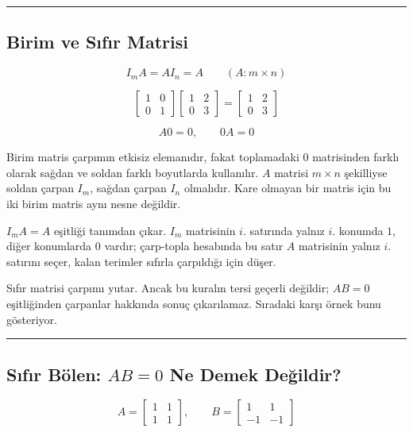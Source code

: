 \documentclass[
  letterpaper,
  DIV=11,
  numbers=noendperiod]{scrartcl}
\begin{document}
\begin{center}\rule{0.5\linewidth}{0.5pt}\end{center}

\subsection{Birim ve Sıfır
Matrisi}\label{birim-ve-sux131fux131r-matrisi}

\[
I_mA=AI_n=A
\qquad (A:m\times n)
\]

\[
\begin{bmatrix}1&0\\0&1\end{bmatrix}
\begin{bmatrix}1&2\\0&3\end{bmatrix}
=\begin{bmatrix}1&2\\0&3\end{bmatrix}
\]

\[
A0=0,
\qquad
0A=0
\]

Birim matris çarpımın etkisiz elemanıdır, fakat toplamadaki \(0\)
matrisinden farklı olarak sağdan ve soldan farklı boyutlarda kullanılır.
\(A\) matrisi \(m\times n\) şekilliyse soldan çarpan \(I_m\), sağdan
çarpan \(I_n\) olmalıdır. Kare olmayan bir matris için bu iki birim
matris aynı nesne değildir.

\(I_mA=A\) eşitliği tanımdan çıkar. \(I_m\) matrisinin \(i\). satırında
yalnız \(i\). konumda \(1\), diğer konumlarda \(0\) vardır; çarp-topla
hesabında bu satır \(A\) matrisinin yalnız \(i\). satırını seçer, kalan
terimler sıfırla çarpıldığı için düşer.

Sıfır matrisi çarpımı yutar. Ancak bu kuralın tersi geçerli değildir;
\(AB=0\) eşitliğinden çarpanlar hakkında sonuç çıkarılamaz. Sıradaki
karşı örnek bunu gösteriyor.

\begin{center}\rule{0.5\linewidth}{0.5pt}\end{center}

\subsection{\texorpdfstring{Sıfır Bölen: \(AB=0\) Ne Demek
Değildir?}{Sıfır Bölen: AB=0 Ne Demek Değildir?}}\label{sux131fux131r-buxf6len-ab0-ne-demek-deux11fildir}

\[
A=\begin{bmatrix}1&1\\1&1\end{bmatrix},
\qquad
B=\begin{bmatrix}1&1\\-1&-1\end{bmatrix}
\]
\end{document}
